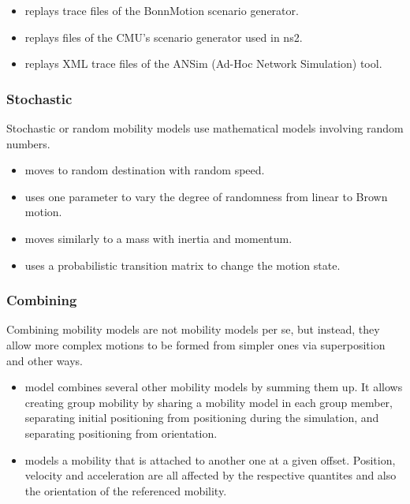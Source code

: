 \begin{itemize}
    \item {} replays trace files of the BonnMotion scenario generator.
    \item {} replays files of the CMU's scenario generator used in ns2.
    \item {} replays XML trace files of the ANSim (Ad-Hoc Network Simulation) tool.
\end{itemize}

\subsubsection*{Stochastic}

Stochastic or random mobility models use mathematical models involving random numbers.

\begin{itemize}
    \item {} moves to random destination with random speed.
    \item {} uses one parameter to vary the degree of randomness from linear to Brown motion.
    \item {} moves similarly to a mass with inertia and momentum.
    \item {} uses a probabilistic transition matrix to change the motion state.
\end{itemize}

\subsubsection*{Combining}

Combining mobility models are not mobility models per se, but instead, they
allow more complex motions to be formed from simpler ones via superposition
and other ways.

\begin{itemize}
        \item {} model combines several other mobility models by summing them up. It allows creating group mobility by sharing a mobility model in each group member, separating initial positioning from positioning during the simulation, and separating positioning from orientation.
        \item {} models a mobility that is attached to another one at a given offset. Position, velocity and acceleration are all affected by the respective quantites and also the orientation of the referenced mobility.
\end{itemize}

